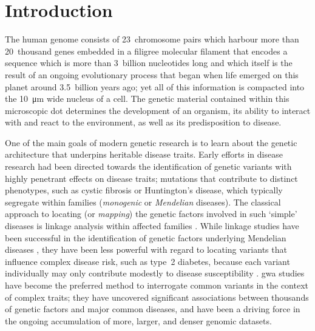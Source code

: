 
\glsresetall



{
\singlespacing
\chapter{Introduction}
\label{ch:introduction}
\minitoc
}

The human genome consists of 23~chromosome pairs which harbour more than 20~thousand genes embedded in a filigree molecular filament that encodes a sequence which is more than 3~billion nucleotides long and which itself is the result of an ongoing evolutionary process that began when life emerged on this planet around 3.5~billion years ago; yet all of this information is compacted into the \SI{10}{\micro\metre} wide nucleus of a cell.
The genetic material contained within this microscopic dot determines the development of an organism, its ability to interact with and react to the environment, as well as its predisposition to disease.

One of the main goals of modern genetic research is to learn about the genetic architecture that underpins heritable disease traits.
Early efforts in disease research had been directed towards the identification of genetic variants with highly penetrant effects on disease traits; \eg mutations that contribute to distinct phenotypes, such as cystic fibrosis or Huntington’s disease, which typically segregate within families (\ie \emph{monogenic} or \emph{Mendelian} diseases).
The classical approach to locating (or \emph{mapping}) the genetic factors involved in such `simple' diseases is linkage analysis within affected families \citep[\eg, see][]{morris2007}.
While linkage studies have been successful in the identification of genetic factors underlying Mendelian diseases \citep{Altshuler:2008kp}, they have been less powerful with regard to locating variants that influence complex disease risk, such as type~2 diabetes, because each variant individually may only contribute modestly to disease susceptibility \citep{Risch:2000jb,Botstein:2003kf}.
\Gls{gwa} studies have become the preferred method to interrogate common variants in the context of complex traits; they have uncovered significant associations between thousands of genetic factors and major common diseases, and have been a driving force in the ongoing accumulation of more, larger, and denser genomic datasets.

